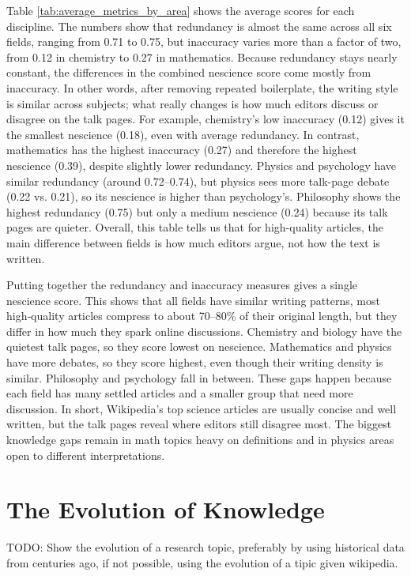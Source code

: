 Table \ref{tab:average_metrics_by_area} shows the average scores for each discipline. The numbers show that redundancy is almost the same across all six fields, ranging from 0.71 to 0.75, but inaccuracy varies more than a factor of two, from 0.12 in chemistry to 0.27 in mathematics. Because redundancy stays nearly constant, the differences in the combined nescience score come mostly from inaccuracy. In other words, after removing repeated boilerplate, the writing style is similar across subjects; what really changes is how much editors discuss or disagree on the talk pages. For example, chemistry’s low inaccuracy (0.12) gives it the smallest nescience (0.18), even with average redundancy. In contrast, mathematics has the highest inaccuracy (0.27) and therefore the highest nescience (0.39), despite slightly lower redundancy. Physics and psychology have similar redundancy (around 0.72–0.74), but physics sees more talk-page debate (0.22 vs. 0.21), so its nescience is higher than psychology’s. Philosophy shows the highest redundancy (0.75) but only a medium nescience (0.24) because its talk pages are quieter. Overall, this table tells us that for high-quality articles, the main difference between fields is how much editors argue, not how the text is written.

Putting together the redundancy and inaccuracy measures gives a single nescience score. This shows that all fields have similar writing patterns, most high‑quality articles compress to about 70–80\% of their original length, but they differ in how much they spark online discussions. Chemistry and biology have the quietest talk pages, so they score lowest on nescience. Mathematics and physics have more debates, so they score highest, even though their writing density is similar. Philosophy and psychology fall in between. These gaps happen because each field has many settled articles and a smaller group that need more discussion. In short, Wikipedia’s top science articles are usually concise and well written, but the talk pages reveal where editors still disagree most. The biggest knowledge gaps remain in math topics heavy on definitions and in physics areas open to different interpretations.

%
%

\section{The Evolution of Knowledge}

{\color{red} TODO: Show the evolution of a research topic, preferably by using historical data from centuries ago, if not possible, using the evolution of a tipic given wikipedia.}

